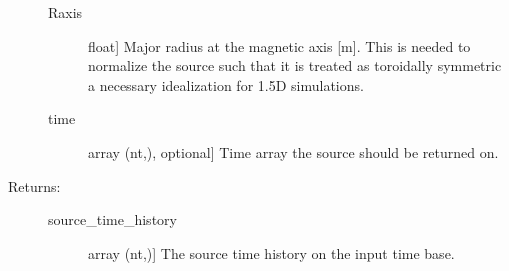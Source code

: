 \documentclass[letterpaper,10pt,english]{sphinxmanual}
\begin{document}
\begin{fulllineitems}
\begin{description}
\begin{description}
\item[{Raxis}] \leavevmode{[}float{]}
Major radius at the magnetic axis {[}m{]}. This is needed to normalize the 
source such that it is treated as toroidally symmetric \textendash{} a necessary
idealization for 1.5D simulations.

\item[{time}] \leavevmode{[}array (nt,), optional{]}
Time array the source should be returned on.

\end{description}

\item[{Returns: }] \leavevmode\begin{description}
\item[{source\_time\_history}] \leavevmode{[}array (nt,){]}
The source time history on the input time base.

\end{description}

\end{description}

\end{fulllineitems}

\end{document}
